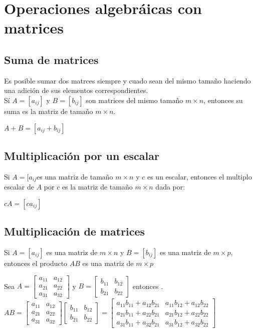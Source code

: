\section{Operaciones algebr\'aicas con matrices}
\subsection{Suma de matrices}
Es posible sumar dos matrces siempre y cuado sean del mismo tamaño haciendo una adici\'on de sus elementos correspondientes.\\
S\'i $A=[a_{ij}]$ y $B=[b_{ij}]$ son matrices del mismo tamaño $m \times n$, entonces su suma es la matriz de tamaño $m \times n$. \\
\begin{center}
$A+B=[a_{ij}+b_{ij}]$
\end{center}
\subsection{Multiplicaci\'on por un escalar}
Si $A=[a_{ij}$es una matriz de tamaño $m \times n$ y $c$ es un escalar, entonces el multiplo escalar de $A$ por $c$ es la matriz de tamaño $m \times n$ dada por:
\begin{center}
$cA=[ca_{ij}]$
\end{center}  
\subsection{Multiplicaci\'on de matrices}
Si $A=[a_{ij}]$ es una matriz de $m \times n$ y $B=[b_{ij}]$ es una matriz de $m \times p$, entonces el producto $AB$ es una matriz de $m \times p$
\begin{center}
Sea $A=\begin{bmatrix}
a_{11} & a_{12}\\
a_{21} & a_{22}\\
a_{31} & a_{32}
\end{bmatrix}$ y $B=\begin{bmatrix}
b_{11} & b_{12}\\
b_{21} & b_{22}
\end{bmatrix}$ entonces \bigskip \bigskip .
$AB=\begin{bmatrix}
a_{11} & a_{12}\\
a_{21} & a_{22}\\
a_{31} & a_{32}
\end{bmatrix}
\begin{bmatrix}
b_{11} & b_{12}\\
b_{21} & b_{22}
\end{bmatrix}=
\begin{bmatrix}
a_{11}b_{11}+a_{12}b_{21} & a_{11}b_{12}+a_{12}b_{22}\\
a_{21}b_{11}+a_{22}b_{21} & a_{21}b_{12}+a_{22}b_{22}\\
a_{31}b_{11}+a_{32}b_{21} & a_{31}b_{12}+a_{32}b_{22}
\end{bmatrix}$
\end{center}
